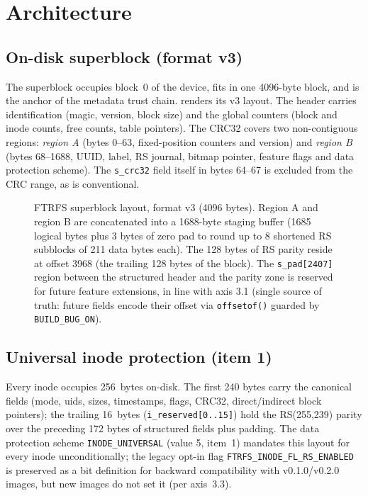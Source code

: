 \section{Architecture}\label{sec:architecture}

\subsection{On-disk superblock (format v3)}

The superblock occupies block~0 of the device, fits in one
4096-byte block, and is the anchor of the metadata trust chain.
 renders its v3 layout. The header carries
identification (magic, version, block size) and the global
counters (block and inode counts, free counts, table pointers).
The CRC32 covers two non-contiguous regions: \emph{region A}
(bytes 0--63, fixed-position counters and version) and
\emph{region B} (bytes 68--1688, UUID, label, RS journal, bitmap
pointer, feature flags and data protection scheme). The
\texttt{s\_crc32} field itself in bytes 64--67 is excluded from
the CRC range, as is conventional.

\begin{figure}[t]
\centering

\caption{FTRFS superblock layout, format v3 (4096 bytes).
Region A and region B are concatenated into a 1688-byte staging
buffer (1685 logical bytes plus 3 bytes of zero pad to round up
to 8 shortened RS subblocks of 211 data bytes each). The 128 bytes
of RS parity reside at offset 3968 (the trailing 128 bytes of the
block). The \texttt{s\_pad[2407]} region between the structured
header and the parity zone is reserved for future feature
extensions, in line with axis 3.1 (single source of truth: future
fields encode their offset via \texttt{offsetof()} guarded by
\texttt{BUILD\_BUG\_ON}).}
\label{fig:sb-layout}
\end{figure}

\subsection{Universal inode protection (item 1)}

Every inode occupies 256~bytes on-disk. The first 240 bytes carry
the canonical fields (mode, uids, sizes, timestamps, flags, CRC32,
direct/indirect block pointers); the trailing 16~bytes
(\texttt{i\_reserved[0..15]}) hold the RS(255,239) parity over the
preceding 172 bytes of structured fields plus padding. The data
protection scheme \texttt{INODE\_UNIVERSAL} (value 5, item~1)
mandates this layout for every inode unconditionally; the legacy
opt-in flag \texttt{FTRFS\_INODE\_FL\_RS\_ENABLED} is preserved as
a bit definition for backward compatibility with v0.1.0/v0.2.0
images, but new images do not set it (per axis~3.3).


